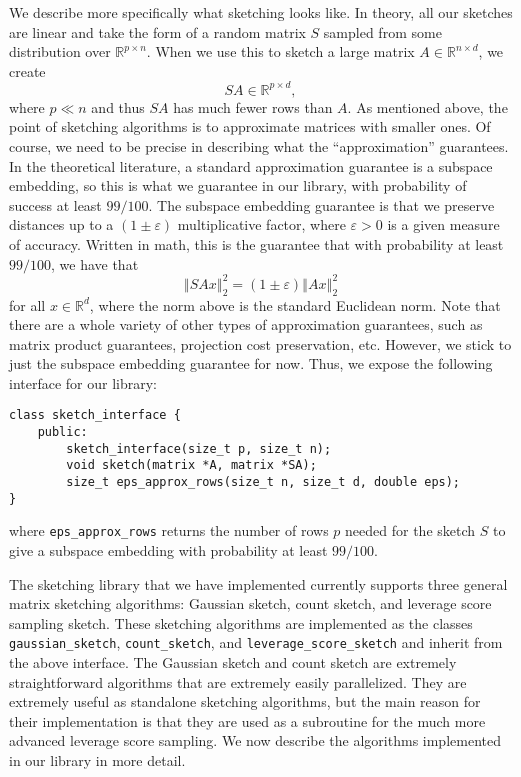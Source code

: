 \documentclass[12pt]{article}
\providecommand{\norm}[1]{\left\Vert#1\right\Vert}
\begin{document}
We describe more specifically what sketching looks like. In theory, all our sketches are linear and take the form of a random matrix $S$ sampled from some distribution over $\mathbb R^{p\times n}$. When we use this to sketch a large matrix $A\in\mathbb R^{n\times d}$, we create
\[
	SA\in\mathbb R^{p\times d},
\]
where $p\ll n$ and thus $SA$ has much fewer rows than $A$. As mentioned above, the point of sketching algorithms is to approximate matrices with smaller ones. Of course, we need to be precise in describing what the ``approximation'' guarantees. In the theoretical literature, a standard approximation guarantee is a subspace embedding, so this is what we guarantee in our library, with probability of success at least $99/100$. The subspace embedding guarantee is that we preserve distances up to a $(1\pm\varepsilon)$ multiplicative factor, where $\varepsilon>0$ is a given measure of accuracy. Written in math, this is the guarantee that with probability at least $99/100$, we have that
\[
	\norm{SAx}_2^2 = (1\pm\varepsilon)\norm{Ax}_2^2
\]
for all $x\in\mathbb R^d$, where the norm above is the standard Euclidean norm. Note that there are a whole variety of other types of approximation guarantees, such as matrix product guarantees, projection cost preservation, etc. However, we stick to just the subspace embedding guarantee for now. Thus, we expose the following interface for our library:
\begin{lstlisting}
class sketch_interface {
	public:
		sketch_interface(size_t p, size_t n);
		void sketch(matrix *A, matrix *SA);
		size_t eps_approx_rows(size_t n, size_t d, double eps);
}
\end{lstlisting}
where \texttt{eps\_approx\_rows} returns the number of rows $p$ needed for the sketch $S$ to give a subspace embedding with probability at least $99/100$. 

The sketching library that we have implemented currently supports three general matrix sketching algorithms: Gaussian sketch, count sketch, and leverage score sampling sketch. These sketching algorithms are implemented as the classes \texttt{gaussian\_sketch}, \texttt{count\_sketch}, and \texttt{leverage\_score\_sketch} and inherit from the above interface. The Gaussian sketch and count sketch are extremely straightforward algorithms that are extremely easily parallelized. They are extremely useful as standalone sketching algorithms, but the main reason for their implementation is that they are used as a subroutine for the much more advanced leverage score sampling. We now describe the algorithms implemented in our library in more detail. 
\end{document}
